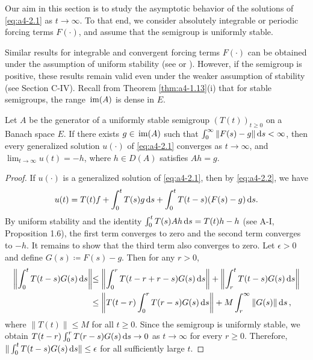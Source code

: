 Our aim in this section is to study the asymptotic behavior of the solutions of \eqref{eq:a4-2.1} as $t \to \infty$. 
To that end, we consider absolutely integrable or periodic forcing terms $F(\cdot)$, and assume that the semigroup
is uniformly stable.

Similar results for integrable and convergent forcing terms $F(\cdot)$ can
be obtained under the assumption of uniform stability (see \citet[p.119]{pazy:1983} or \citet{neubrander:1985b}). 
However, if the
semigroup is positive, these results remain valid even under the weaker assumption of stability (see Section C-IV).
Recall from Theorem \ref{thm:a4-1.13}(i) that for stable
semigroups, the range $\mathop{}\mathrm{im}(A)$ is dense in $E$.

\begin{theorem}\label{thm:a4-2.1}
Let $A$ be the generator of a uniformly stable semigroup
$(T(t))_{t \geq 0}$ on a Banach space $E$. 
If there exists $g \in \mathop{}\mathrm{im}(A)$ such that
$\int_{0}^{\infty} \|F(s) - g\|  \mathop{}\!\mathrm{d}{s} < \infty$, then every generalized solution $u(\cdot)$ of
\eqref{eq:a4-2.1} converges as $t \to \infty$, and $\lim_{t \to \infty} u(t) = -h$, where $h \in D(A)$ satisfies
$Ah = g$.
\end{theorem}

\begin{proof}
If $u(\cdot)$ is a generalized solution of \eqref{eq:a4-2.1}, then by \eqref{eq:a4-2.2}, we have
\[
u(t) = T(t)f + \int_{0}^{t} T(s)g  \mathop{}\!\mathrm{d}{s} + \int_{0}^{t} T(t-s)(F(s)-g)  \mathop{}\!\mathrm{d}{s}.
\]
By uniform
stability and the identity $\int_0^t T(s)Ah \mathop{}\!\mathrm{d}{s} = T(t)h - h$ (see A-I, Proposition 1.6), the first term converges to zero
and the second term converges to $-h$. 
It remains to show that the
third term also converges to zero. 
Let $\epsilon > 0$ and define $G(s) \coloneqq F(s)-g$. 
Then for any $r>0$,
\begin{align*}
\left\|\int_{0}^{t} T(t-s)G(s)  \mathop{}\!\mathrm{d}{s}\right\| & 
{\leq \left\|\int_{0}^{r} T(t-r+r-s)G(s)  \mathop{}\!\mathrm{d}{s}\right\| + \left\|\int_{r}^{t} T(t-s)G(s)  \mathop{}\!\mathrm{d}{s}\right\|}\\
& 
{\leq \left\|T(t-r)\int_{0}^{r} T(r-s)G(s)  \mathop{}\!\mathrm{d}{s}\right\| + M \int_{r}^{\infty} \|G(s)\|  \mathop{}\!\mathrm{d}{s}\,},
\end{align*}
where $\|T(t)\|\le M$ for all $t\ge 0$. Since the semigroup is uniformly stable, we obtain
$T(t-r)\int_{0}^{r} T(r-s)G(s)  \mathop{}\!\mathrm{d}{s} \to 0$ as $t \to \infty$ for every $r \geq 0$.
Therefore, $\|\int_{0}^{t} T(t-s)G(s)  \mathop{}\!\mathrm{d}{s}\| \leq \epsilon$ for all sufficiently large $t$.
\end{proof}


